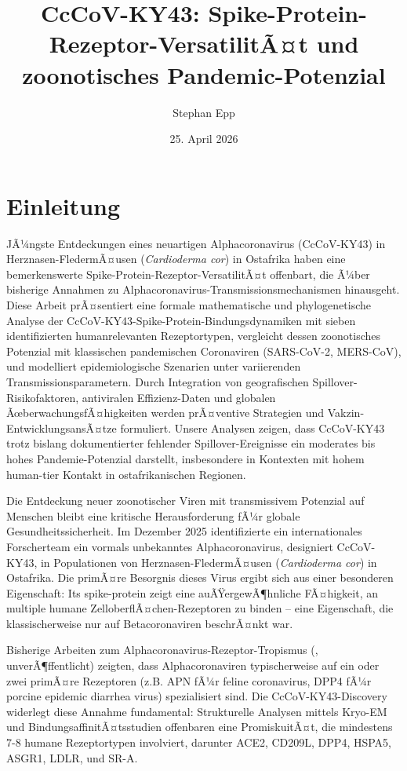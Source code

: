﻿\documentclass[11pt,a4paper]{article}
\title{\Large \textbf{CcCoV-KY43: Spike-Protein-Rezeptor-VersatilitÃ¤t und zoonotisches Pandemic-Potenzial}}
\author{Stephan Epp}
\date{25. April 2026}
\theoremstyle{definition}
\begin{document}
\maketitle
\tableofcontents
\newpage

\section{Einleitung}
JÃ¼ngste Entdeckungen eines neuartigen Alphacoronavirus (CcCoV-KY43) in Herznasen-Fleder\-mÃ¤usen (\textit{Cardioderma cor}) in Ostafrika haben eine bemerkenswerte Spike-Protein-Rezeptor-VersatilitÃ¤t offenbart, die Ã¼ber bisherige Annahmen zu Alphacoronavirus-Transmissionsmechanis\-men hinausgeht. Diese Arbeit prÃ¤sentiert eine formale mathematische und phylogenetische Analyse der CcCoV-KY43-Spike-Protein-Bindungsdynamiken mit sieben identifizierten humanrelevanten Rezeptortypen, vergleicht dessen zoonotisches Potenzial mit klassischen pandemischen Coronaviren (SARS-CoV-2, MERS-CoV), und modelliert epidemiologische Szenarien unter variierenden Transmissionsparametern. Durch Integration von geografischen Spillover-Risikofaktoren, antiviralen Effizienz-Daten und globalen ÃœberwachungsfÃ¤higkeiten werden prÃ¤ventive Strategien und Vakzin-EntwicklungsansÃ¤tze formuliert. Unsere Analysen zeigen, dass CcCoV-KY43 trotz bislang dokumentierter fehlender Spillover-Ereignisse ein moderates bis hohes Pandemie-Potenzial darstellt, insbesondere in Kontexten mit hohem human-tier Kontakt in ostafrikanischen Regionen.

Die Entdeckung neuer zoonotischer Viren mit transmissivem Potenzial auf Menschen bleibt eine kritische Herausforderung fÃ¼r globale Gesundheitssicherheit. Im Dezember 2025 identifizierte ein internationales Forscherteam ein vormals unbekanntes Alphacoronavirus, designiert CcCoV-KY43, in Populationen von Herznasen-FledermÃ¤usen (\textit{Cardioderma cor}) in Ostafrika. Die primÃ¤re Besorgnis dieses Virus ergibt sich aus einer besonderen Eigenschaft: Its spike-protein zeigt eine auÃŸergewÃ¶hnliche FÃ¤higkeit, an multiple humane ZelloberflÃ¤chen-Rezeptoren zu binden -- eine Eigenschaft, die klassischerweise nur auf Betacoronaviren beschrÃ¤nkt war.

Bisherige Arbeiten zum Alphacoronavirus-Rezeptor-Tropismus (\cite{bailey2024receptors}, unverÃ¶ffentlicht) zeigten, dass Alphacoronaviren typischerweise auf ein oder zwei primÃ¤re Rezeptoren (z.B. APN fÃ¼r feline coronavirus, DPP4 fÃ¼r porcine epidemic diarrhea virus) spezialisiert sind. Die CcCoV-KY43-Discovery widerlegt diese Annahme fundamental: Strukturelle Analysen mittels Kryo-EM und BindungsaffinitÃ¤tsstudien offenbaren eine PromiskuitÃ¤t, die mindestens 7-8 humane Rezeptortypen involviert, darunter ACE2, CD209L, DPP4, HSPA5, ASGR1, LDLR, und SR-A.
\end{document}
